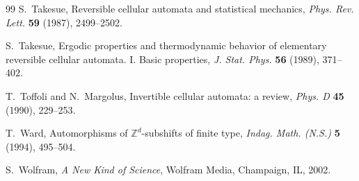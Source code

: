 \documentclass[11pt]{amsart}
\theoremstyle{definition}
\theoremstyle{remark}
\begin{document}
\begin{thebibliography}{99}
 S.~Takesue, Reversible cellular automata and statistical mechanics, \emph{Phys. Rev. Lett.} \textbf{59} (1987), 2499--2502.

 S.~Takesue, Ergodic properties and thermodynamic behavior of elementary reversible cellular automata. I. Basic properties, \emph{J. Stat. Phys.} \textbf{56} (1989), 371--402.

 T.~Toffoli and N.~Margolus, Invertible cellular automata: a review, \emph{Phys. D} \textbf{45} (1990), 229--253.

 T.~Ward, Automorphisms of $\mathbb{Z}^d$-subshifts of finite type, \emph{Indag. Math. (N.S.)} \textbf{5} (1994), 495--504.

 S.~Wolfram, \emph{A New Kind of Science}, Wolfram Media, Champaign, IL, 2002.

\end{thebibliography}
\end{document}
